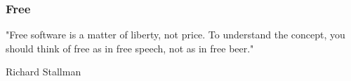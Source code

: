 \documentclass{beamer}
\begin{document}
\begin{frame}
  \frametitle{Free}
  \begin{LARGE}
    "Free software is a matter of liberty, not price. To understand
    the concept, you should think of free as in free speech, not as in
    free beer."

    \vspace{1em}

    \textemdash Richard Stallman
  \end{LARGE}

\end{frame}



\end{document}

